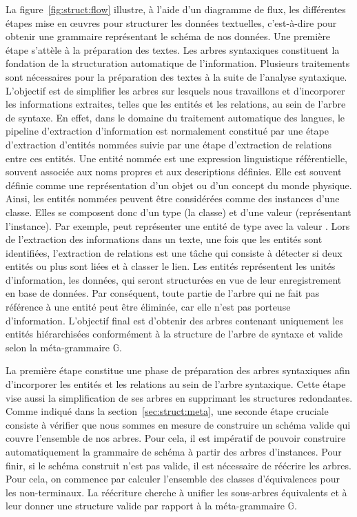 La figure~\ref{fig:struct:flow} illustre, à l'aide d'un diagramme de flux, les différentes étapes mise en œuvres pour structurer les données textuelles, c'est-à-dire pour obtenir une grammaire représentant le schéma de nos données.
Une première étape s'attèle à la préparation des textes.
Les arbres syntaxiques constituent la fondation de la structuration automatique de l'information.
Plusieurs traitements sont nécessaires pour la préparation des textes à la suite de l'analyse syntaxique.
L'objectif est de simplifier les arbres sur lesquels nous travaillons et d'incorporer les informations extraites, telles que les entités et les relations, au sein de l'arbre de syntaxe.
En effet, dans le domaine du traitement automatique des langues, le pipeline d'extraction d'information est normalement constitué par une étape d'extraction d'entités nommées suivie par une étape d'extraction de relations entre ces entités. 
Une entité nommée est une expression linguistique référentielle, souvent associée aux noms propres et aux descriptions définies.
Elle est souvent définie comme une représentation d'un objet ou d'un concept du monde physique.
Ainsi, les entités nommées peuvent être considérées comme des instances d'une classe.
Elles se composent donc d'un type (la classe) et d'une valeur (représentant l'instance).
Par exemple,  peut représenter une entité de type  avec la valeur .
Lors de l'extraction des informations dans un texte, une fois que les entités sont identifiées, l'extraction de relations est une tâche qui consiste à détecter si deux entités ou plus sont liées et à classer le lien.
Les entités représentent les unités d'information, les données, qui seront structurées en vue de leur enregistrement en base de données.
Par conséquent, toute partie de l'arbre qui ne fait pas référence à une entité peut être éliminée, car elle n'est pas porteuse d'information.
L'objectif final est d'obtenir des arbres contenant uniquement les entités hiérarchisées conformément à la structure de l'arbre de syntaxe et valide selon la méta-grammaire $\mathbb{G}$.

La première étape constitue une phase de préparation des arbres syntaxiques afin d'incorporer les entités et les relations au sein de l'arbre syntaxique.
Cette étape vise aussi la simplification de ses arbres en supprimant les structures redondantes.
Comme indiqué dans la section~\ref{sec:struct:meta}, une seconde étape cruciale consiste à vérifier que nous sommes en mesure de construire un schéma valide qui couvre l'ensemble de nos arbres.
Pour cela, il est impératif de pouvoir construire automatiquement la grammaire de schéma à partir des arbres d'instances.
Pour finir, si le schéma construit n'est pas valide, il est nécessaire de réécrire les arbres.
Pour cela, on commence par calculer l'ensemble des classes d'équivalences pour les non-terminaux.
La réécriture cherche à unifier les sous-arbres équivalents et à leur donner une structure valide par rapport à la méta-grammaire $\mathbb{G}$.

